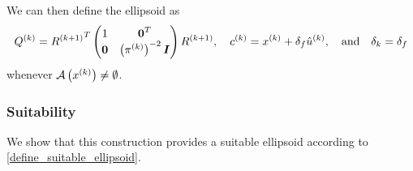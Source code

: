 We can then define the ellipsoid as
\begin{align}
\label{define_linear_nontrival_ellipsoid}
{Q^{(k)}} = {R^{(k+1)}}^T \begin{pmatrix}
1 & \boldsymbol0^T \\
\boldsymbol 0 & \left({\pi^{(k)}}\right)^{-2} \boldsymbol I \\
\end{pmatrix} {R^{(k+1)}},
\quad
c^{(k)} = x^{(k)}+\delta_{f} {{{\hat u}^{(k)}}},
\quad
\textrm{and}
\quad
\delta_k=\delta_{f}
\end{align}
whenever ${\mathcal A}\left(x^{(k)}\right) \ne \emptyset$.





\subsubsection{Suitability}

We show that this construction provides a suitable ellipsoid according to \cref{define_suitable_ellipsoid}.


